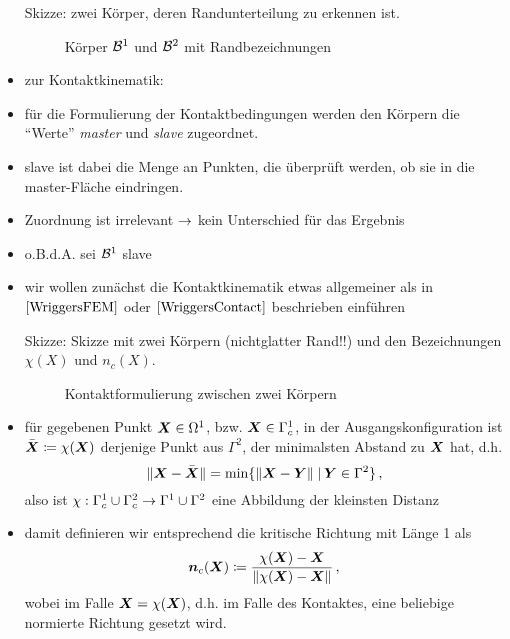 \begin{itemize}
\item[Skizze:] zwei Körper, deren Randunterteilung zu erkennen ist.
\begin{figure}[h]
\caption{Körper $\mathcal B^1$ und $\mathcal B^2$ mit Randbezeichnungen}
\end{figure}

\item zur Kontaktkinematik:

\item für die Formulierung der Kontaktbedingungen werden den Körpern die "`Werte"' \textit{master} und \textit{slave} zugeordnet.

\item slave ist dabei die Menge an Punkten, die überprüft werden, ob sie in die master-Fläche eindringen.

\item Zuordnung ist irrelevant $\rightarrow$ kein Unterschied für das Ergebnis

\item o.B.d.A. sei $\mathcal B^1$ slave

\item wir wollen zunächst die Kontaktkinematik etwas allgemeiner als in $\cite{WriggersFEM}$ oder $\cite{WriggersContact}$ beschrieben einführen

\item[Skizze:] Skizze mit zwei Körpern (nichtglatter Rand!!) und den Bezeichnungen $\chi(X)$ und $n_c(X)$.

\begin{figure}[h]
\caption{Kontaktformulierung zwischen zwei Körpern}
\end{figure}

\item für gegebenen Punkt $\boldsymbol X \in \Omega^1$, bzw. $\boldsymbol X \in \Gamma^1_c$, in der Ausgangskonfiguration ist $\bar{\boldsymbol X} \coloneqq \chi(\boldsymbol X)$ derjenige Punkt aus $\Gamma^2$, der minimalsten Abstand zu $\boldsymbol X$ hat, d.h.
\[
	\lVert \boldsymbol X-\bar{\boldsymbol X}\rVert = \min \{\lVert \boldsymbol X-\boldsymbol Y\rVert \;\vert\, \boldsymbol Y \in \Gamma^2\} \, ,
\]
also ist $\chi: \Gamma_c^1\cup \Gamma_c^2 \rightarrow \Gamma^1 \cup \Gamma^2$ eine Abbildung der kleinsten Distanz

\item damit definieren wir entsprechend die kritische Richtung mit Länge 1 als
\begin{align}
	\boldsymbol n_c(\boldsymbol X) \coloneqq \frac{\chi(\boldsymbol X) - \boldsymbol X}{\lVert \chi (\boldsymbol X)-\boldsymbol X\rVert} \, ,
\end{align}
wobei im Falle $\boldsymbol X = \chi(\boldsymbol X)$, d.h. im Falle des Kontaktes, eine beliebige normierte Richtung gesetzt wird.


\end{itemize}

